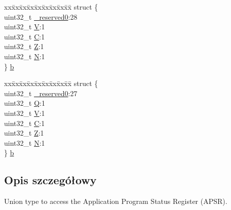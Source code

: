 \begin{DoxyCompactItemize}
\begin{tabbing}
\end{tabbing}\item 
\begin{tabbing}
xx\=xx\=xx\=xx\=xx\=xx\=xx\=xx\=xx\=\kill
struct \{\\
\>uint32\_t \hyperlink{union_a_p_s_r___type_afbce95646fd514c10aa85ec0a33db728}{\_reserved0}:28\\
\>uint32\_t \hyperlink{union_a_p_s_r___type_a8004d224aacb78ca37774c35f9156e7e}{V}:1\\
\>uint32\_t \hyperlink{union_a_p_s_r___type_a86e2c5b891ecef1ab55b1edac0da79a6}{C}:1\\
\>uint32\_t \hyperlink{union_a_p_s_r___type_a3b04d58738b66a28ff13f23d8b0ba7e5}{Z}:1\\
\>uint32\_t \hyperlink{union_a_p_s_r___type_a7e7bbba9b00b0bb3283dc07f1abe37e0}{N}:1\\
\} \hyperlink{union_a_p_s_r___type_a5885cdad9332135e09169739d2fbbf92}{b}\\

\end{tabbing}\item 
\begin{tabbing}
xx\=xx\=xx\=xx\=xx\=xx\=xx\=xx\=xx\=\kill
struct \{\\
\>uint32\_t \hyperlink{union_a_p_s_r___type_afbce95646fd514c10aa85ec0a33db728}{\_reserved0}:27\\
\>uint32\_t \hyperlink{union_a_p_s_r___type_a22d10913489d24ab08bd83457daa88de}{Q}:1\\
\>uint32\_t \hyperlink{union_a_p_s_r___type_a8004d224aacb78ca37774c35f9156e7e}{V}:1\\
\>uint32\_t \hyperlink{union_a_p_s_r___type_a86e2c5b891ecef1ab55b1edac0da79a6}{C}:1\\
\>uint32\_t \hyperlink{union_a_p_s_r___type_a3b04d58738b66a28ff13f23d8b0ba7e5}{Z}:1\\
\>uint32\_t \hyperlink{union_a_p_s_r___type_a7e7bbba9b00b0bb3283dc07f1abe37e0}{N}:1\\
\} \hyperlink{union_a_p_s_r___type_a46fb8779e294d82ba0cd2941fdb94366}{b}\\

\end{tabbing}\end{DoxyCompactItemize}


\subsection{Opis szczegółowy}
Union type to access the Application Program Status Register (A\+P\+SR). 

